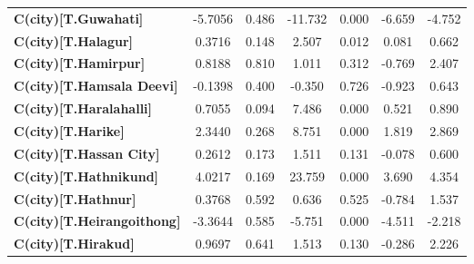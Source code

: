\begin{center}
\begin{tabular}{lcccccc}
\textbf{C(city)[T.Guwahati]}                                                                        &      -5.7056  &        0.486     &   -11.732  &         0.000        &       -6.659    &       -4.752     \\
\textbf{C(city)[T.Halagur]}                                                                         &       0.3716  &        0.148     &     2.507  &         0.012        &        0.081    &        0.662     \\
\textbf{C(city)[T.Hamirpur]}                                                                        &       0.8188  &        0.810     &     1.011  &         0.312        &       -0.769    &        2.407     \\
\textbf{C(city)[T.Hamsala Deevi]}                                                                   &      -0.1398  &        0.400     &    -0.350  &         0.726        &       -0.923    &        0.643     \\
\textbf{C(city)[T.Haralahalli]}                                                                     &       0.7055  &        0.094     &     7.486  &         0.000        &        0.521    &        0.890     \\
\textbf{C(city)[T.Harike]}                                                                          &       2.3440  &        0.268     &     8.751  &         0.000        &        1.819    &        2.869     \\
\textbf{C(city)[T.Hassan City]}                                                                     &       0.2612  &        0.173     &     1.511  &         0.131        &       -0.078    &        0.600     \\
\textbf{C(city)[T.Hathnikund]}                                                                      &       4.0217  &        0.169     &    23.759  &         0.000        &        3.690    &        4.354     \\
\textbf{C(city)[T.Hathnur]}                                                                         &       0.3768  &        0.592     &     0.636  &         0.525        &       -0.784    &        1.537     \\
\textbf{C(city)[T.Heirangoithong]}                                                                  &      -3.3644  &        0.585     &    -5.751  &         0.000        &       -4.511    &       -2.218     \\
\textbf{C(city)[T.Hirakud]}                                                                         &       0.9697  &        0.641     &     1.513  &         0.130        &       -0.286    &        2.226     \\

\end{tabular}
\end{center}
